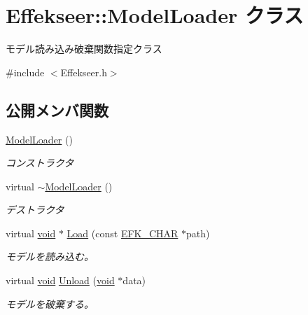 \hypertarget{class_effekseer_1_1_model_loader}{}\section{Effekseer\+:\+:Model\+Loader クラス}
\label{class_effekseer_1_1_model_loader}


モデル読み込み破棄関数指定クラス  




{\ttfamily \#include $<$Effekseer.\+h$>$}

\subsection*{公開メンバ関数}
\begin{DoxyCompactItemize}
\item 
\mbox{\hyperlink{class_effekseer_1_1_model_loader_afc540fe063379c6412134edfa893c65e}{Model\+Loader}} ()
\begin{DoxyCompactList}\small\item\em コンストラクタ \end{DoxyCompactList}\item 
virtual \mbox{\hyperlink{class_effekseer_1_1_model_loader_a0edc24d2c8d4e3c18ef52f34ac5d5fc5}{$\sim$\+Model\+Loader}} ()
\begin{DoxyCompactList}\small\item\em デストラクタ \end{DoxyCompactList}\item 
virtual \mbox{\hyperlink{namespace_effekseer_ab34c4088e512200cf4c2716f168deb56}{void}} $\ast$ \mbox{\hyperlink{class_effekseer_1_1_model_loader_a46b7aba9f998836bacd86411b858d06c}{Load}} (const \mbox{\hyperlink{_effekseer_8h_a50b026abea014b47854bcd835b3b6233}{E\+F\+K\+\_\+\+C\+H\+AR}} $\ast$path)
\begin{DoxyCompactList}\small\item\em モデルを読み込む。 \end{DoxyCompactList}\item 
virtual \mbox{\hyperlink{namespace_effekseer_ab34c4088e512200cf4c2716f168deb56}{void}} \mbox{\hyperlink{class_effekseer_1_1_model_loader_a496f93a8615363ff31943adb205b5365}{Unload}} (\mbox{\hyperlink{namespace_effekseer_ab34c4088e512200cf4c2716f168deb56}{void}} $\ast$data)
\begin{DoxyCompactList}\small\item\em モデルを破棄する。 \end{DoxyCompactList}\end{DoxyCompactItemize}


